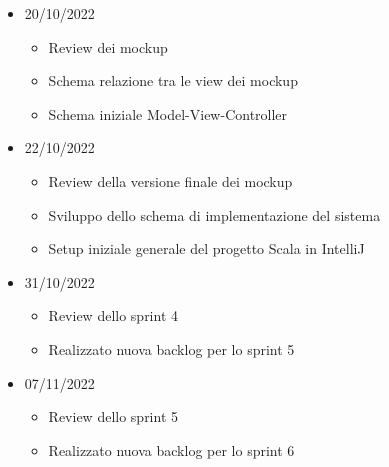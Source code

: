 \begin{itemize}
\begin{itemize}
        \end{itemize}
    \item 20/10/2022
        \begin{itemize}
            \item Review dei mockup
            \item Schema relazione tra le view dei mockup
            \item Schema iniziale Model-View-Controller
        \end{itemize}
    \item 22/10/2022
        \begin{itemize}
            \item Review della versione finale dei mockup
            \item Sviluppo dello schema di implementazione del sistema
            \item Setup iniziale generale del progetto Scala in IntelliJ
        \end{itemize}
    \item 31/10/2022
        \begin{itemize}
            \item Review dello sprint 4
            \item Realizzato nuova backlog per lo sprint 5
        \end{itemize}
    \item 07/11/2022
        \begin{itemize}
            \item Review dello sprint 5
            \item Realizzato nuova backlog per lo sprint 6
        \end{itemize}
\end{itemize}


